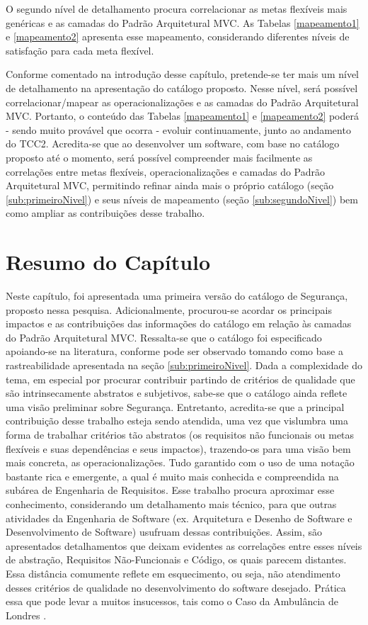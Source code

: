 O segundo nível de detalhamento procura correlacionar as metas flexíveis mais genéricas e as camadas do Padrão Arquitetural MVC. As Tabelas \ref{mapeamento1} e \ref{mapeamento2} apresenta esse mapeamento, considerando diferentes níveis de satisfação para cada meta flexível.


Conforme comentado na introdução desse capítulo, pretende-se ter mais um nível de detalhamento na apresentação do catálogo proposto. Nesse nível, será possível correlacionar/mapear as operacionalizações e as camadas do Padrão Arquitetural MVC. Portanto, o conteúdo das Tabelas \ref{mapeamento1} e \ref{mapeamento2} poderá - sendo muito provável que ocorra - evoluir continuamente, junto ao andamento do TCC2. Acredita-se que ao desenvolver um software, com base no catálogo proposto até o momento, será possível compreender mais facilmente as correlações entre metas flexíveis, operacionalizações e camadas do Padrão Arquitetural MVC, permitindo refinar ainda mais o próprio catálogo (seção \ref{sub:primeiroNivel}) e seus níveis de mapeamento (seção \ref{sub:segundoNivel}) bem como ampliar as contribuições desse trabalho.

\pagebreak

\section{Resumo do Capítulo}

Neste capítulo, foi apresentada uma primeira versão do catálogo de Segurança, proposto nessa pesquisa. Adicionalmente, procurou-se acordar os principais impactos e as contribuições das informações do catálogo em relação às camadas do Padrão Arquitetural MVC. Ressalta-se que o catálogo foi especificado apoiando-se na literatura, conforme pode ser observado tomando como base a rastreabilidade apresentada na seção \ref{sub:primeiroNivel}.
Dada a complexidade do tema, em especial por procurar contribuir partindo de critérios de qualidade que são intrinsecamente abstratos e subjetivos, sabe-se que o catálogo ainda reflete uma visão preliminar sobre Segurança. Entretanto, acredita-se que a principal contribuição desse trabalho esteja sendo atendida, uma vez que vislumbra uma forma de trabalhar critérios tão abstratos (os requisitos não funcionais ou metas flexíveis e suas dependências e seus impactos), trazendo-os para uma visão bem mais concreta, as operacionalizações. Tudo garantido com o uso de uma notação bastante rica e emergente, a qual é muito mais conhecida e compreendida na subárea de Engenharia de Requisitos. Esse trabalho procura aproximar esse conhecimento, considerando um detalhamento mais técnico, para que outras atividades da Engenharia de Software (ex. Arquitetura e Desenho de Software e Desenvolvimento de Software) usufruam dessas contribuições. Assim, são apresentados detalhamentos que deixam evidentes as correlações entre esses níveis de abstração, Requisitos Não-Funcionais e Código, os quais parecem distantes. Essa distância comumente reflete em esquecimento, ou seja, não atendimento desses critérios de qualidade no desenvolvimento do software desejado. Prática essa que pode levar a muitos insucessos, tais como o Caso da Ambulância de Londres \cite{finkelstein1996comedy}.


